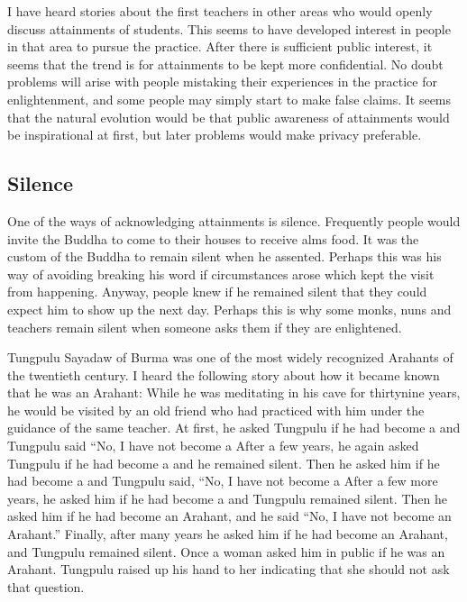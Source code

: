 \documentclass[a5paper,10pt,english]{book}
\begin{document}
\sphinxAtStartPar
I have heard stories about the first teachers in other areas who would
openly discuss attainments of students. This seems to have developed
interest in people in that area to pursue the practice. After there is
sufficient public interest, it seems that the trend is for attainments
to be kept more confidential. No doubt problems will arise with people
mistaking their experiences in the practice for enlightenment, and some
people may simply start to make false claims. It seems that the natural
evolution would be that public awareness of attainments would be
inspirational at first, but later problems would make privacy
preferable.


\subsection{Silence}
\label{\detokenize{saints:silence}}
\sphinxAtStartPar
One of the ways of acknowledging attainments is silence. Frequently
people would invite the Buddha to come to their houses to receive alms
food. It was the custom of the Buddha to remain silent when he assented.
Perhaps this was his way of avoiding breaking his word if circumstances
arose which kept the visit from happening. Anyway, people knew if he
remained silent that they could expect him to show up the next day.
Perhaps this is why some monks, nuns and teachers remain silent when
someone asks them if they are enlightened.

\sphinxAtStartPar
Tungpulu Sayadaw of Burma was one of the most widely recognized Arahants
of the twentieth century. I heard the following story about how it
became known that he was an Arahant: While he was meditating in his cave
for thirty\sphinxhyphen{}nine years, he would be visited by an old friend who had
practiced with him under the guidance of the same teacher. At first, he
asked Tungpulu if he had become a  and Tungpulu said
“No, I have not become a  After a few years, he again
asked Tungpulu if he had become a  and he remained
silent. Then he asked him if he had become a  and
Tungpulu said, “No, I have not become a  After a few
more years, he asked him if he had become a  and
Tungpulu remained silent. Then he asked him if he had become an Arahant,
and he said “No, I have not become an Arahant.” Finally, after many
years he asked him if he had become an Arahant, and Tungpulu remained
silent. Once a woman asked him in public if he was an Arahant. Tungpulu
raised up his hand to her indicating that she should not ask that
question.
\end{document}
